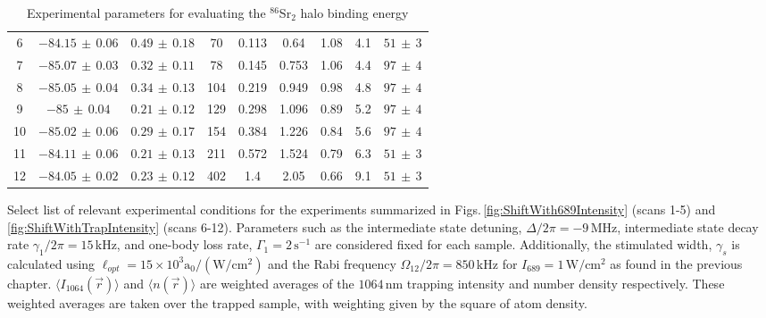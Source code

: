 \begin{table}[]
{\begin{tabular}{ccccccccc}
6 & $-84.15\,\pm\,0.06$ & $0.49\,\pm\,0.18$ & 70 & 0.113 & 0.64 & 1.08 & 4.1 & $51\,\pm\,3$ \\
7 & $-85.07\,\pm\,0.03$ & $0.32\,\pm\,0.11$ & 78 & 0.145 & 0.753 & 1.06 & 4.4 & $97\,\pm\,4$ \\
8 & $-85.05\,\pm\,0.04$ & $0.34\,\pm\,0.13$ & 104 & 0.219 & 0.949 & 0.98 & 4.8 & $97\,\pm\,4$ \\
9 & $-85\,\pm\,0.04$ & $0.21\,\pm\,0.12$ & 129 & 0.298 & 1.096 & 0.89 & 5.2 & $97\,\pm\,4$ \\
10 & $-85.02\,\pm\,0.06$ & $0.29\,\pm\,0.17$ & 154 & 0.384 & 1.226 & 0.84 & 5.6 & $97\,\pm\,4$ \\
11 & $-84.11\,\pm\,0.06$ & $0.21\,\pm\,0.13$ & 211 & 0.572 & 1.524 & 0.79 & 6.3 & $51\,\pm\,3$ \\
12 & $-84.05\,\pm\,0.02$ & $0.23\,\pm\,0.12$ & 402 & 1.4 & 2.05 & 0.66 & 9.1 & $51\,\pm\,3$
\end{tabular}%
}
\caption{Experimental parameters for evaluating the $^{86}$Sr$_2$ halo binding energy}{Select list of relevant experimental conditions for the experiments summarized in Figs.\,\ref{fig:ShiftWith689Intensity} (scans 1-5) and \ref{fig:ShiftWithTrapIntensity} (scans 6-12). Parameters such as the intermediate state detuning, $\Delta/2\pi = -9\,$MHz,  intermediate state decay rate $\gamma_1/2\pi=15\,$kHz, and one-body loss rate, $\Gamma_1=2\,\text{s}^{-1}$ are considered fixed for each sample. Additionally, the stimulated width, $\gamma_s$ is calculated using $\ell_{opt} = 15 \times 10^{3}\text{a}_0/(\text{W}/\text{cm}^2)$ and the Rabi frequency $\Omega_{12}/2\pi=850\,$kHz for $I_{689}=1\,\text{W}/\text{cm}^2$ as found in the previous chapter. $\langle I_{1064}(\vec{r}) \rangle$ and $\langle n(\vec{r}) \rangle$ are weighted averages of the $1064\,$nm trapping intensity and number density respectively. These weighted averages are taken over the trapped sample, with weighting given by the square of atom density.}
\label{tab:5expParams}
\end{table}



